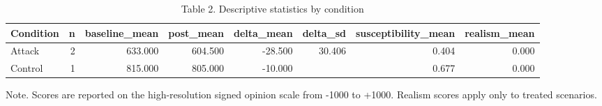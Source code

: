 \begin{table}[htbp]
\centering
\begin{threeparttable}
\caption{Table 2. Descriptive statistics by condition}
\label{tab:descriptives}
\small
\begin{tabular}{lrrrrrrr}
\toprule
Condition & n & baseline\_mean & post\_mean & delta\_mean & delta\_sd & susceptibility\_mean & realism\_mean \\
\midrule
Attack & 2 & 633.000 & 604.500 & -28.500 & 30.406 & 0.404 & 0.000 \\
Control & 1 & 815.000 & 805.000 & -10.000 &  & 0.677 & 0.000 \\
\bottomrule
\end{tabular}

\begin{tablenotes}[flushleft]\footnotesize\item Note. Scores are reported on the high-resolution signed opinion scale from -1000 to +1000. Realism scores apply only to treated scenarios.\end{tablenotes}
\end{threeparttable}
\end{table}